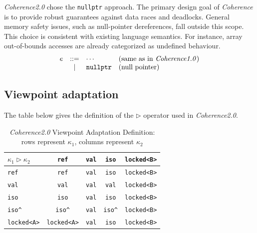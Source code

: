 \textit{Coherence2.0} chose the \texttt{nullptr} approach. The primary design goal of \textit{Coherence} is to provide robust guarantees against data races and deadlocks. General memory safety issues, such as null-pointer dereferences, fall outside this scope. This choice is consistent with existing language semantics. For instance, array out-of-bounds accesses are already categorized as undefined behaviour.
\[
\begin{array}{lcll}
e & ::= & \cdots & \text{(same as in \textit{Coherence1.0})} \\
  & \mid & \mathtt{nullptr} & \text{(null pointer)} \\
\end{array}
\]

\subsection{Viewpoint adaptation} \label{sec:coherence_viewpoint_adaptation}
The table below gives the definition of the $\triangleright$ operator used in \textit{Coherence2.0}.
\begin{table}[H]
\centering
\label{tab:viewpoint-adaptation}
\begin{tabular}{|l|c|c|c|c|}
\hline
\rowcolor{gray!20} $\kappa_1 \triangleright \kappa_2$ & \texttt{ref} & \texttt{val} & \texttt{iso} & \texttt{locked<B>} \\ \hline
\cellcolor{gray!20} \texttt{ref} & \texttt{ref} & \texttt{val} & \texttt{iso} & \texttt{locked<B>} \\ \hline
\cellcolor{gray!20} \texttt{val} & \texttt{val} & \texttt{val} & \texttt{val} & \texttt{locked<B>} \\ \hline
\cellcolor{gray!20} \texttt{iso} & \texttt{iso} & \texttt{val} & \texttt{iso} & \texttt{locked<B>} \\ \hline
\cellcolor{gray!20} \texttt{iso\textasciicircum} & \texttt{iso\textasciicircum} & \texttt{val} & \texttt{iso\textasciicircum} & \texttt{locked<B>} \\ \hline
\cellcolor{gray!20} \texttt{locked<A>} & \texttt{locked<A>} & \texttt{val} & \texttt{iso} & \texttt{locked<B>} \\ \hline
\end{tabular}
\caption{\textit{Coherence2.0} Viewpoint Adaptation Definition: rows represent $\kappa_1$, columns represent $\kappa_2$}
\end{table}

